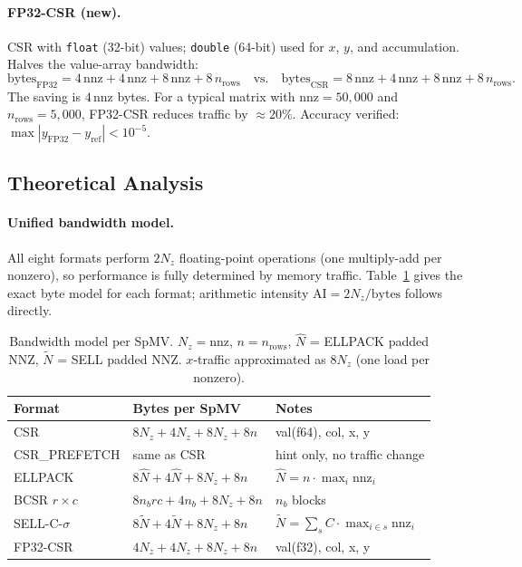 \documentclass[11pt]{article}
\begin{document}
\paragraph{FP32-CSR (new).}
CSR with \texttt{float} (32-bit) values; \texttt{double} (64-bit) used for
$x$, $y$, and accumulation.  Halves the value-array bandwidth:
\[
  \text{bytes}_\text{FP32} = 4\,\text{nnz} + 4\,\text{nnz} + 8\,\text{nnz} + 8\,n_\text{rows}
  \quad\text{vs.}\quad
  \text{bytes}_\text{CSR} = 8\,\text{nnz} + 4\,\text{nnz} + 8\,\text{nnz} + 8\,n_\text{rows}.
\]
The saving is $4\,\text{nnz}$ bytes.  For a typical matrix with $\text{nnz}
= 50{,}000$ and $n_\text{rows}=5{,}000$, FP32-CSR reduces traffic by
$\approx 20\%$.  Accuracy verified: $\max|y_\text{FP32}-y_\text{ref}|<10^{-5}$.

\subsection{Theoretical Analysis}

\paragraph{Unified bandwidth model.}
{\sloppy All eight formats perform $2N_z$ floating-point operations (one
multiply-add per nonzero), so performance is fully determined by memory
traffic.  Table~\ref{tab:bwmodel} gives the exact byte model for each
format; arithmetic intensity $\mathrm{AI}=2N_z/\text{bytes}$ follows
directly.\par}

\begin{table}[h]
\centering\small
\begin{tabular}{lll}
\toprule
Format & Bytes per SpMV & Notes \\
\midrule
CSR            & $8N_z + 4N_z + 8N_z + 8n$ & val(f64), col, x, y \\
CSR\_PREFETCH  & same as CSR & hint only, no traffic change \\
ELLPACK        & $8\hat{N} + 4\hat{N} + 8N_z + 8n$ & $\hat{N}=n\cdot\max_i \text{nnz}_i$ \\
BCSR $r{\times}c$ & $8n_b rc + 4n_b + 8N_z + 8n$ & $n_b$ blocks \\
SELL-C-$\sigma$& $8\tilde{N} + 4\tilde{N} + 8N_z + 8n$ & $\tilde{N}=\sum_s C\cdot\max_{i\in s}\text{nnz}_i$ \\
FP32-CSR       & $4N_z + 4N_z + 8N_z + 8n$ & val(f32), col, x, y \\
\bottomrule
\end{tabular}
\caption{Bandwidth model per SpMV. $N_z=\text{nnz}$, $n=n_\text{rows}$,
$\hat{N}$ = ELLPACK padded NNZ, $\tilde{N}$ = SELL padded NNZ.
$x$-traffic approximated as $8N_z$ (one load per nonzero).}
\label{tab:bwmodel}
\end{table}
\end{document}
